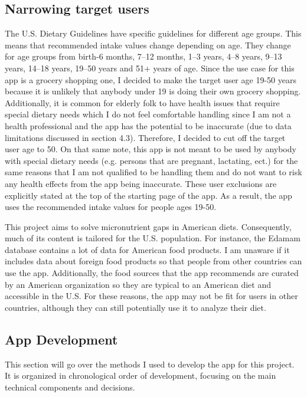 \documentclass[10pt,twocolumn]{article}
\begin{document}
\subsection{Narrowing target users}

The U.S. Dietary Guidelines have specific guidelines for different age groups. This means that recommended intake values change depending on age. They change for age groups from birth-6 months, 7–12 months, 1–3 years, 4–8 years, 9–13 years, 14–18 years, 19–50 years and 51+ years of age. Since the use case for this app is a grocery shopping one, I decided to make the target user age 19-50 years because it is unlikely that anybody under 19 is doing their own grocery shopping. Additionally, it is common for elderly folk to have health issues that require special dietary needs which I do not feel comfortable handling since I am not a health professional and the app has the potential to be inaccurate (due to data limitations discussed in section 4.3). Therefore, I decided to cut off the target user age to 50. On that same note, this app is not meant to be used by anybody with special dietary needs (e.g. persons that are pregnant, lactating, ect.) for the same reasons that I am not qualified to be handling them and do not want to risk any health effects from the app being inaccurate. These user exclusions are explicitly stated at the top of the starting page of the app. As a result, the app uses the recommended intake values for people ages 19-50. 

This project aims to solve micronutrient gaps in American diets. Consequently, much of its content is tailored for the U.S. population. For instance, the Edamam database contains a lot of data for American food products. I am unaware if it includes data about foreign food products so that people from other countries can use the app. Additionally, the food sources that the app recommends are curated by an American organization so they are typical to an American diet and accessible in the U.S. For these reasons, the app may not be fit for users in other countries, although they can still potentially use it to analyze their diet. 

\subsection{App Development}
This section will go over the methods I used to develop the app for this project. It is organized in chronological order of development, focusing on the main technical components and decisions. 
\end{document}
